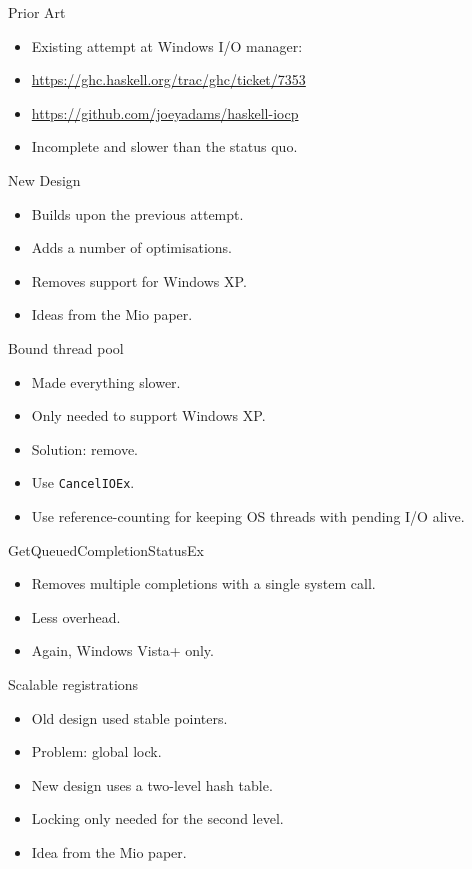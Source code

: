 \documentclass{beamer}
\begin{document}
\begin{frame}{Prior Art}
\begin{itemize}
    \item Existing attempt at Windows I/O manager:
    \item \url{https://ghc.haskell.org/trac/ghc/ticket/7353}
    \item \url{https://github.com/joeyadams/haskell-iocp}
    \item Incomplete and slower than the status quo.
\end{itemize}
\end{frame}

\begin{frame}{New Design}
\begin{itemize}
    \item Builds upon the previous attempt.
    \item Adds a number of optimisations.
    \item Removes support for Windows XP.
    \item Ideas from the Mio paper.
\end{itemize}
\end{frame}

\begin{frame}{Bound thread pool}
  \begin{itemize}
    \item Made everything slower.
    \item Only needed to support Windows XP.
    \item Solution: remove.
    \item Use \texttt{CancelIOEx}.
    \item Use reference-counting for keeping OS threads with pending I/O alive.
\end{itemize}
\end{frame}

\begin{frame}{GetQueuedCompletionStatusEx}
  \begin{itemize}
    \item Removes multiple completions with a single system call.
    \item Less overhead.
    \item Again, Windows Vista+ only.
\end{itemize}
\end{frame}

\begin{frame}{Scalable registrations}
\begin{itemize}
  \item Old design used stable pointers.
  \item Problem: global lock.
  \item New design uses a two-level hash table.
  \item Locking only needed for the second level.
  \item Idea from the Mio paper.
\end{itemize}
\end{frame}
\end{document}
